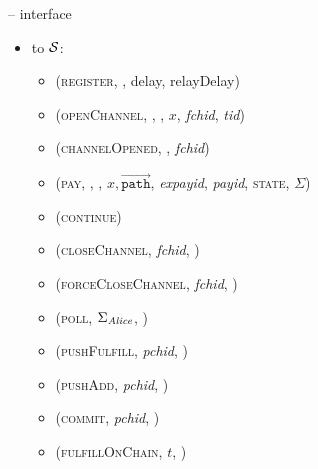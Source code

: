 \begin{figure}[H]
\begin{systembox}{\fpaynet{} -- interface}
\begin{itemize}
\begin{itemize}
          \item (\textsc{registerDone}, \alice, pubKey)
          \item (\textsc{corrupted}, \alice)
          \item (\textsc{channelAnnounced}, \alice, $p_{\alice, F}, p_{\bob,
          F}$, \textit{fchid}, \textit{pchid}, \textit{tid})
          \item (\textsc{update}, \texttt{receipt}, \texttt{diffs}, \alice)
          \item (\textsc{closedChannel}, \texttt{channel}, \alice)
          \item (\textsc{resolvePays}, \texttt{charged})
        \end{itemize}
        \item to $\mathcal{S}$:
        \begin{itemize}
          \item (\textsc{register}, \alice, delay, relayDelay)
          \item (\textsc{openChannel}, \alice, \bob, $x$, \textit{fchid},
          \textit{tid})
          \item (\textsc{channelOpened}, \alice, \textit{fchid})
          \item (\textsc{pay}, \alice, \bob, $x,
          \overrightarrow{\mathtt{path}}$, \textit{expayid}, \textit{payid},
          \textsc{state}, $\Sigma$)
          \item (\textsc{continue})
          \item (\textsc{closeChannel}, \textit{fchid}, \alice)
          \item (\textsc{forceCloseChannel}, \textit{fchid}, \alice)
          \item (\textsc{poll}, $\Sigma_{\mathit{Alice}}$, \alice)
          \item (\textsc{pushFulfill}, \textit{pchid}, \alice)
          \item (\textsc{pushAdd}, \textit{pchid}, \alice)
          \item (\textsc{commit}, \textit{pchid}, \alice)
          \item (\textsc{fulfillOnChain}, $t$, \alice)
        \end{itemize}
      \end{itemize}
    \end{systembox}
    \caption{}
    \label{alg:fpaynet:interface}
  \end{figure}

